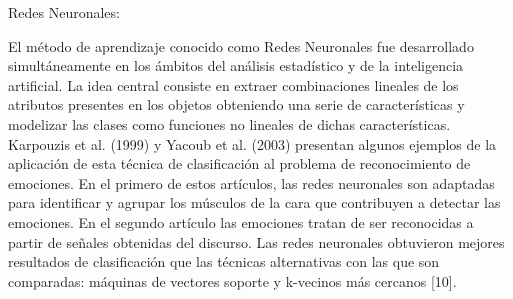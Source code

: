 \begin{enumerate}
{\bf \item Redes Neuronales:} \vskip 0.1cm
El método de aprendizaje conocido como Redes Neuronales fue desarrollado simultáneamente en los ámbitos del análisis estadístico y de la inteligencia artificial. La idea central consiste en extraer combinaciones lineales de los atributos presentes en los objetos obteniendo una serie de características y modelizar las clases como funciones no lineales de dichas características. Karpouzis et al. (1999) y Yacoub et al. (2003) presentan algunos ejemplos de la aplicación de esta técnica de clasificación al problema de reconocimiento de emociones. En el primero de estos artículos, las redes neuronales son adaptadas para identificar y agrupar los músculos de la cara que contribuyen a detectar las emociones. En el segundo artículo las emociones tratan de ser reconocidas a partir de señales obtenidas del discurso. Las redes neuronales obtuvieron mejores resultados de clasificación que las técnicas alternativas con las que son comparadas: máquinas de vectores soporte y k-vecinos más cercanos [10].


\end{enumerate}

